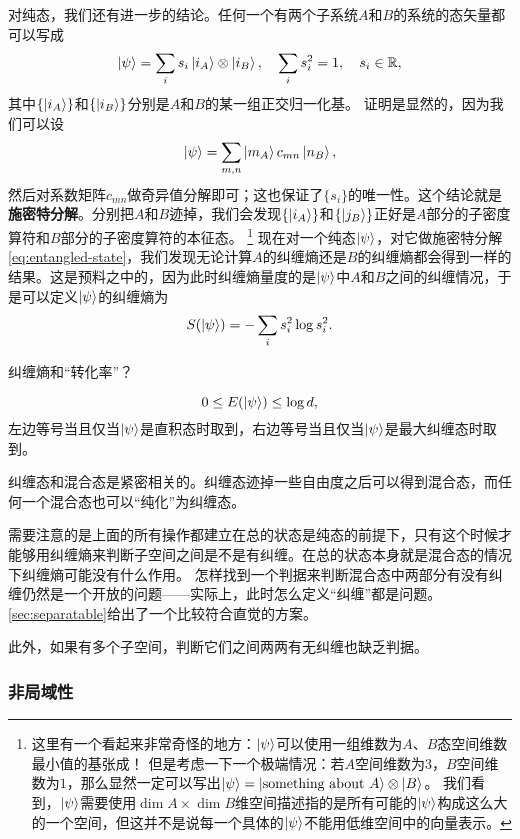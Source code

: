 \documentclass[UTF8, a4paper]{ctexart}
\begin{document}
对纯态，我们还有进一步的结论。任何一个有两个子系统$A$和$B$的系统的态矢量都可以写成
\begin{equation}
    \ket{\psi} = \sum_i s_i \ket{i_A} \otimes \ket{i_B}, \quad \sum_i s_i^2 = 1, \quad s_i \in \mathbb{R},
    \label{eq:entangled-state}
\end{equation}
其中$\{\ket{i_A}\}$和$\{\ket{i_B}\}$分别是$A$和$B$的某一组正交归一化基。
证明是显然的，因为我们可以设
\[
    \ket{\psi} = \sum_{m,n} \ket{m_A} c_{mn} \ket{n_B},
\]
然后对系数矩阵$c_{mn}$做奇异值分解即可；这也保证了$\{s_i\}$的唯一性。这个结论就是\textbf{施密特分解}。分别把$A$和$B$迹掉，我们会发现$\{\ket{i_A}\}$和$\{\ket{j_B}\}$正好是$A$部分的子密度算符和$B$部分的子密度算符的本征态。%
\footnote{
    这里有一个看起来非常奇怪的地方：$\ket{\psi}$可以使用一组维数为$A$、$B$态空间维数最小值的基张成！
    但是考虑一下一个极端情况：若$A$空间维数为$3$，$B$空间维数为$1$，那么显然一定可以写出$\ket{\psi}=\ket{\text{something about $A$}} \otimes \ket{B}$。
    我们看到，$\ket{\psi}$需要使用$\dim A \times \dim B$维空间描述指的是所有可能的$\ket{\psi}$构成这么大的一个空间，但这并不是说每一个具体的$\ket{\psi}$不能用低维空间中的向量表示。
}%
现在对一个纯态$\ket{\psi}$，对它做施密特分解\eqref{eq:entangled-state}，我们发现无论计算$A$的纠缠熵还是$B$的纠缠熵都会得到一样的结果。这是预料之中的，因为此时纠缠熵量度的是$\ket{\psi}$中$A$和$B$之间的纠缠情况，于是可以定义$\ket{\psi}$的纠缠熵为
\begin{equation}
    S(\ket{\psi}) = - \sum_i s_i^2 \log s_i^2.
\end{equation}

纠缠熵和“转化率”？

\begin{equation}
    0 \leq E(\ket{\psi}) \leq \log d,
\end{equation}
左边等号当且仅当$\ket{\psi}$是直积态时取到，右边等号当且仅当$\ket{\psi}$是最大纠缠态时取到。

纠缠态和混合态是紧密相关的。纠缠态迹掉一些自由度之后可以得到混合态，而任何一个混合态也可以“纯化”为纠缠态。

需要注意的是上面的所有操作都建立在总的状态是纯态的前提下，只有这个时候才能够用纠缠熵来判断子空间之间是不是有纠缠。在总的状态本身就是混合态的情况下纠缠熵可能没有什么作用。
怎样找到一个判据来判断混合态中两部分有没有纠缠仍然是一个开放的问题——实际上，此时怎么定义“纠缠”都是问题。
\autoref{sec:separatable}给出了一个比较符合直觉的方案。

此外，如果有多个子空间，判断它们之间两两有无纠缠也缺乏判据。

\subsubsection{非局域性}
\end{document}
